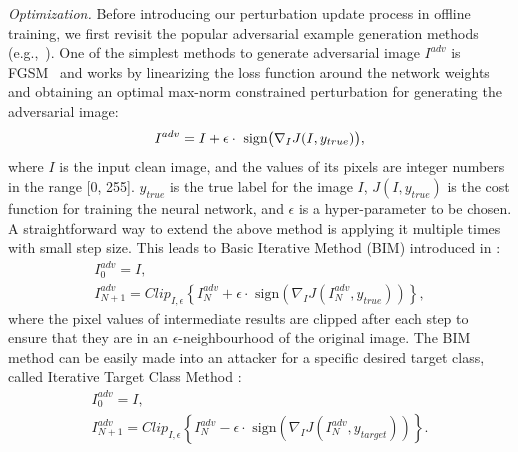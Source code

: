\documentclass[journal]{IEEEtran}
\newcommand{\eg}{e.g.}
\begin{document}
\textit{Optimization.}
Before introducing our perturbation update process in offline training, we first revisit the popular adversarial example generation methods (\eg,~\cite{FGSM, DBLP:conf/iclr/KurakinGB17a}). One of the simplest methods to generate adversarial image $I^{adv}$ is FGSM~\cite{FGSM} and works by linearizing the loss function around the network weights and obtaining an optimal max-norm constrained perturbation for generating the adversarial image:
\begin{equation}
    I^{adv} = I + \epsilon \cdot \text{ sign} \bigl( \nabla_I J(I, y_{true})  \bigr),
    \vspace{-0.1cm}
\end{equation}
where $I$ is the input clean image, and the values of its pixels are integer numbers in the range [0, 255]. $y_{true}$ is the true label for the image $I$, $J(I, y_{true})$ is the cost function for training the neural network, and $\epsilon$ is a hyper-parameter to be chosen. A straightforward way to extend the above method is applying it multiple times with small step size. This leads to Basic Iterative Method (BIM) introduced in \cite{DBLP:conf/iclr/KurakinGB17a}:
\begin{equation}
    \begin{gathered}
        I_0^{adv} = I, \\
        I_{N+1}^{adv} = Clip_{I, \epsilon}\left\{I_N^{adv}+\epsilon \cdot \text{ sign}(\nabla_I J(I_N^{adv},y_{true}))\right\},
    \end{gathered}
\end{equation}
where the pixel values of intermediate results are clipped after each step to ensure that they are in an $\epsilon$-neighbourhood of the original image. The BIM method can be easily made into an attacker for a specific desired target class, called Iterative Target Class Method \cite{DBLP:conf/iclr/KurakinGB17a}:
\begin{equation}
  \begin{gathered}
      I_0^{adv} = I,\\
      I_{N+1}^{adv} = Clip_{I, \epsilon}\left\{I_N^{adv}-\epsilon \cdot \text{ sign}(\nabla_I J(I_N^{adv},y_{target}))\right\}.
  \end{gathered}
  \label{equ:itcm}
\end{equation}
\end{document}
